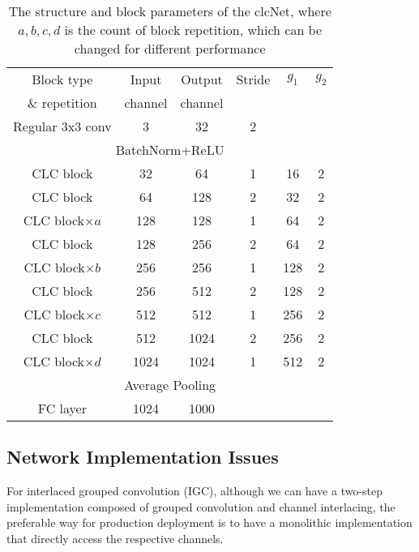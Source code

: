 \documentclass[10pt,twocolumn,letterpaper]{article}
\begin{document}
\begin{table}[h!]\footnotesize
\begin{center}
\begin{tabular}{|c||c|c|c||c|c|}
\hline
Block type & Input & Output  & Stride & $g_1$  & $g_2$  \\
\& repetition & channel & channel & &   &   \\
\hline\hline
Regular 3x3 conv & 3 & 32 & 2 &   &   \\
\hline
\multicolumn{6}{|c|}{BatchNorm+ReLU}\\
\hline
CLC block & 32 & 64 & 1 & 16  & 2  \\
\hline\hline
CLC block & 64 & 128 & 2 & 32  & 2  \\
\hline
CLC block$\times{a}$ & 128 & 128 & 1 & 64  & 2  \\
\hline\hline
CLC block & 128 & 256 & 2 & 64  & 2  \\
\hline
CLC block$\times{b}$ & 256 & 256 & 1 & 128  & 2  \\
\hline\hline
CLC block & 256 & 512 & 2 & 128  & 2  \\
\hline
CLC block$\times{c}$ & 512 & 512 & 1 & 256  & 2  \\
\hline\hline
CLC block & 512 & 1024 & 2 & 256  & 2  \\
\hline
CLC block$\times{d}$& 1024 & 1024 & 1 & 512  & 2  \\
\hline
\multicolumn{6}{|c|}{Average Pooling}\\
\hline
FC layer & 1024  & 1000  &  &   &   \\
\hline
\end{tabular}
\end{center}
\caption{The structure and block parameters of the clcNet, where $a,b,c,d$ is the count of block repetition, which can be changed for different performance}
\label{tb:clcnet}
\end{table}

\subsection{Network Implementation Issues}

For interlaced grouped convolution (IGC), although we can have a two-step implementation composed of grouped convolution and channel interlacing, the preferable way for production deployment is to have a monolithic implementation that directly access the respective channels. 
\end{document}
